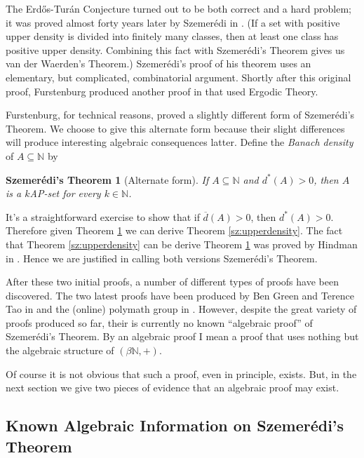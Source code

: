 \documentclass[12pt]{article}
\theoremstyle{plain}
\newtheorem{sz}[thm]{Szemer\'{e}di's Theorem}
\theoremstyle{definition}
\newcommand{\bbN}{\mathbb{N}}
\begin{document}
The Erd\H{o}s-Tur\'{a}n Conjecture turned out to be both correct and a
hard problem; it was proved almost forty years later by Szemer\'{e}di in
\cite{Szemeredi:1975uq}. 
(If a set with positive upper density is divided into finitely many
classes, then at least one class has positive upper density.
Combining this fact with Szemer\'{e}di's Theorem gives us van der
Waerden's Theorem.)
Szemer\'{e}di's proof of his theorem uses an elementary, but
complicated, combinatorial argument. 
Shortly after this original proof, Furstenburg produced another proof
in \cite{Furstenberg:1977fk} that used Ergodic Theory. 

Furstenburg, for technical reasons, proved a slightly different form
of Szemer\'{e}di's Theorem. 
We choose to give this alternate form because their slight differences
will produce interesting algebraic consequences latter.
Define the \textsl{Banach density} of $A \subseteq \bbN$ by
  
  \begin{sz}[Alternate form]
    \label{sz:banach}
    If $A \subseteq \bbN$ and $d^*(A) > 0$, then $A$ is a $k$AP-set
    for every $k \in \bbN$.
  \end{sz}
It's a straightforward exercise to show that if $\overline{d}(A) > 0$,
then $d^*(A) > 0$.
Therefore given Theorem \ref{sz:banach} we can derive Theorem
\ref{sz:upperdensity}.
The fact that Theorem \ref{sz:upperdensity} can be derive Theorem
\ref{sz:banach} was proved by Hindman in \cite[Theorem
2.1]{Hindman:1982fk}.
Hence we are justified in calling both versions Szemer\'{e}di's
Theorem. 

After these two initial proofs, a number of different types of proofs
have been discovered. 
The two latest proofs have been produced by Ben Green and Terence Tao
in \cite{Green:2010uq} and the (online) polymath group in
\cite{Polymath:2010kx}. 
However, despite the great variety of proofs produced so far, their is
currently no known ``algebraic proof'' of Szemer\'{e}di's Theorem.
By an algebraic proof I mean a proof that uses nothing but the
algebraic structure of $(\beta\bbN, +)$. 

Of course it is not obvious that such a proof, even in principle,
exists.
But, in the next section we give two pieces of evidence that an
algebraic proof may exist. 

\subsection{Known Algebraic Information on  Szemer\'{e}di's Theorem}
\end{document}

